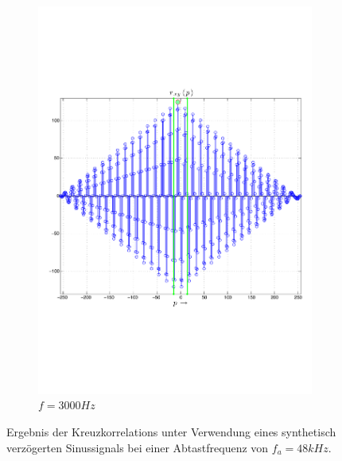 \begin{figure}
\begin{subfigure}[b]{0.48\textwidth}
                \includegraphics[width=\textwidth]{images/02_Konzeptionierung/sine_rxy_f_3000}
                \caption{$f=3000Hz$}
                \label{fig:sine_rxy_f_3000}
        \end{subfigure}
        \caption{Ergebnis der Kreuzkorrelations unter Verwendung eines synthetisch verzögerten Sinussignals bei einer Abtastfrequenz von $f_a=48kHz$.}
        \label{fig:Sim_sine_r_xy}
\end{figure}

